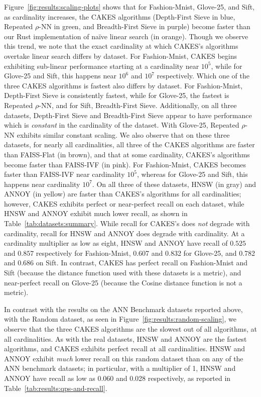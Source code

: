 Figure~\ref{fig:results:scaling-plots} shows that for Fashion-Mnist, Glove-25, and Sift, as cardinality increases, the CAKES algorithms (Depth-First Sieve in blue, Repeated $\rho$-NN in green, and Breadth-First Sieve in purple) become faster than our Rust implementation of na\"{i}ve linear search (in orange).
Though we observe this trend, we note that the exact cardinality at which CAKES's algorithms overtake linear search differs by dataset. For Fashion-Mnist, CAKES begins exhibiting sub-linear performance starting at a cardinality near $10^5$, while for Glove-25 and Sift, this happens near $10^6$ and $10^7$ respectively. 
Which one of the three CAKES algorithms is fastest also differs by dataset.
For Fashion-Mnist, Depth-First Sieve is consistently fastest, while for Glove-25, the fastest is Repeated $\rho$-NN, and for Sift, Breadth-First Sieve. 
Additionally, on all three datasets, Depth-First Sieve and Breadth-First Sieve appear to have performance which is \textit{constant} in the cardinality of the dataset. 
With Glove-25, Repeated $\rho$-NN exhibits similar constant scaling. 
We also observe that on these three datasets, for nearly all cardinalities, all three of the CAKES algorithms are faster than FAISS-Flat (in brown), and that at some cardinality, CAKES's algorithms become faster than FAISS-IVF (in pink). 
For Fashion-Mnist, CAKES becomes faster than FAISS-IVF near cardinality $10^5$, whereas for Glove-25 and Sift, this happens near cardinality $10^7$. 
On all three of these datasets, HNSW (in gray) and ANNOY (in yellow) are faster than CAKES's algorithms for all cardinalities; however, CAKES exhibits perfect or near-perfect recall on each dataset, while HNSW and ANNOY exhibit much lower recall, as shown in Table~\ref{tab:datasets:summary}.
While recall for CAKES's does \emph{not} degrade with cardinality, recall for HNSW and ANNOY does degrade with cardinality. 
At a cardinality multiplier as low as eight, HNSW and ANNOY have recall of $0.525$ and $0.857$ respectively for Fashion-Mnist, 0.607 and 0.832 for Glove-25, and 0.782 and 0.686 on Sift. 
In contrast, CAKES has perfect recall on Fashion-Mnist and Sift (because the distance function used with these datasets is a metric), and near-perfect recall on Glove-25 (because the Cosine distance function is not a metric).


In contrast with the results on the ANN Benchmark datasets reported above, with the Random dataset, as seen in Figure~\ref{fig:results:random-scaling}, we observe that the three CAKES algorithms are the slowest out of all algorithms, at all cardinalities.
As with the real datasets, HNSW and ANNOY are the fastest algorithms, and CAKES exhibits perfect recall at all cardinalities.
HNSW and ANNOY exhibit \textit{much} lower recall on this random dataset than on any of the ANN benchmark datasets;
in particular, with a multiplier of 1, HNSW and ANNOY have recall as low as 0.060 and 0.028 respectively, as reported in Table~\ref{tab:results:qps-and-recall}.

